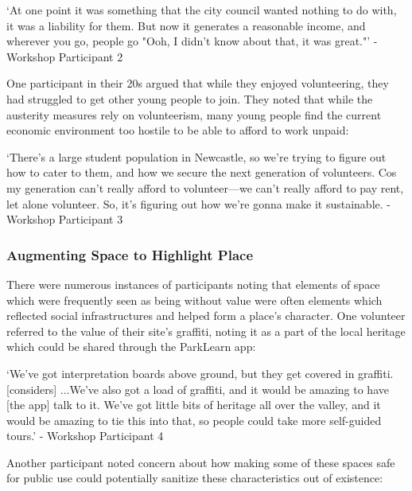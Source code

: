 \begin{displayquote}
`At one point it was something that the city council wanted nothing to do with, it was a liability for them. But now it generates a reasonable income, and wherever you go, people go "Ooh, I didn't know about that, it was great."' - Workshop Participant 2
\end{displayquote}

One participant in their 20s argued that while they enjoyed volunteering, they had struggled to get other young people to join. They noted that while the austerity measures rely on volunteerism, many young people find the current economic environment too hostile to be able to afford to work unpaid: 

\begin{displayquote}
`There's a large student population in Newcastle, so we're trying to figure out how to cater to them, and how we secure the next generation of volunteers. Cos my generation can't really afford to volunteer---we can't really afford to pay rent, let alone volunteer. So, it's figuring out how we're gonna make it sustainable. - Workshop Participant 3
\end{displayquote}

\subsubsection{Augmenting Space to Highlight Place}

There were numerous instances of participants noting that elements of space which were frequently seen as being without value were often elements which reflected social infrastructures and helped form a place's character. One volunteer referred to the value of their site's graffiti, noting it as a part of the local heritage which could be shared through the ParkLearn app:

\begin{displayquote}
`We've got interpretation boards above ground, but they get covered in graffiti. [considers] ...We've also got a load of graffiti, and it would be amazing to have [the app] talk to it. We've got little bits of heritage all over the valley, and it would be amazing to tie this into that, so people could take more self-guided tours.' - Workshop Participant 4
\end{displayquote}

Another participant noted concern about how making some of these spaces safe for public use could potentially sanitize these characteristics out of existence:

